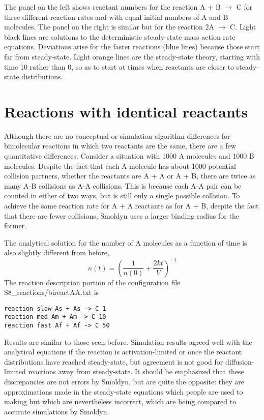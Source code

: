 \documentclass {scrbook}
\begin{document}
The panel on the left shows reactant numbers for the reaction A + B $\rightarrow$ C for three different reaction rates and with equal initial numbers of A and B molecules. The panel on the right is similar but for the reaction 2A $\rightarrow$ C. Light black lines are solutions to the deterministic steady-state mass action rate equations. Deviations arise for the faster reactions (blue lines) because those start far from steady-state. Light orange lines are the steady-state theory, starting with time 10 rather than 0, so as to start at times when reactants are closer to steady-state distributions.

\section{Reactions with identical reactants}

Although there are no conceptual or simulation algorithm differences for bimolecular reactions in which two reactants are the same, there are a few quantitative differences. Consider a situation with 1000 A molecules and 1000 B molecules. Despite the fact that each A molecule has about 1000 potential collision partners, whether the reactants are A + A or A + B, there are twice as many A-B collisions as A-A collisions. This is because each A-A pair can be counted in either of two ways, but is still only a single possible collision. To achieve the same reaction rate for A + A reactants as for A + B, despite the fact that there are fewer collisions, Smoldyn uses a larger binding radius for the former.

The analytical solution for the number of A molecules as a function of time is also slightly different from before,
$$n(t) = \left(\frac{1}{n(0)} + \frac{2kt}{V} \right)^{-1}$$
The reaction description portion of the configuration file S8\_reactions/bireactAA.txt is

\begin{lstlisting}[style=SSAC]
reaction slow As + As -> C 1
reaction med Am + Am -> C 10
reaction fast Af + Af -> C 50
\end{lstlisting}
Results are similar to those seen before. Simulation results agreed well with the analytical equations if the reaction is activation-limited or once the reactant distributions have reached steady-state, but agreement is not good for diffusion-limited reactions away from steady-state. It should be emphasized that these discrepancies are not errors by Smoldyn, but are quite the opposite: they are approximations made in the steady-state equations which people are used to making but which are nevertheless incorrect, which are being compared to accurate simulations by Smoldyn.
\end{document}
